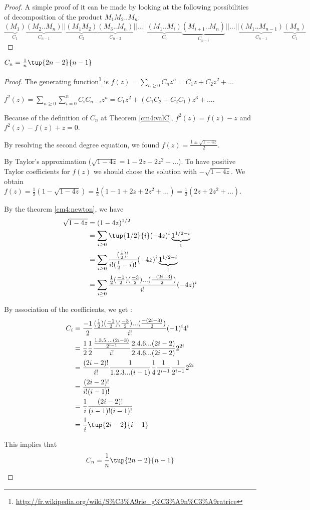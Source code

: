 \begin{proof} A simple proof of it can be made by looking at the following possibilities of decomposition of the product $M_1M_2..M_n$: 
$$\underbrace{(M_1)}_{C_1}\underbrace{(M_2..M_n)}_{C_{n-1}} || \underbrace{(M_1M_2)}_{C_2}\underbrace{(M_3..M_n)}_{C_{n-2}}|| ...|| \underbrace{(M_1..M_i)}_{C_i}\underbrace{(M_{i+1}..M_n)}_{C_{n-i}}|| ...|| \underbrace{(M_1..M_{n-1})}_{C_{n-1}}\underbrace{(M_n)}_{C_1}$$
\end{proof}



\begin{theorem}
$C_n = \frac{1}{n} \tup{2n-2}{n-1}$
\end{theorem}

\begin{proof}
The generating function\footnote{\url{http://fr.wikipedia.org/wiki/S\%C3\%A9rie_g\%C3\%A9n\%C3\%A9ratrice}} is $f(z) = \sum_{n\geq 0} C_n z^n = C_1z+C_2z^2 +...$

$f^2(z) = \sum_{n \geq 0}\sum_{i=0}^{n}C_i C_{n-i} z^n = C_1z^2+(C_1C_2+C_2C_1)z^3+....$ 

Because of the definition of $C_n$ at Theorem \ref{cm4:valC}, $f^2(z)=f(z) - z$ and $f^2(z)-f(z)+z = 0$.

By resolving the second degree equation, we found $f(z)=\frac{1\pm \sqrt{1-4z}}{2}$.

By Taylor's approximation ($\sqrt{1-4z}  = 1-2z-2z^2-...$). To have positive Taylor coefficients for $f(z)$ we should chose the solution with $-\sqrt{1-4z}$. We obtain $f(z) = \frac{1}{2}(1-\sqrt{1-4z}) = \frac{1}{2}(1-1+2z+2z^2+...) = \frac{1}{2}(2z+2z^2+...)$.

By the theorem \ref{cm4:newton}, we have
\begin{align*}
\sqrt{1-4z} &= (1-4z)^{1/2}\\
&= \sum_{i\geq 0} \tup{1/2}{i}(-4z)^i \underbrace{1^{1/2-i}}_{1}\\
&= \sum_{i\geq 0}\frac{(\frac{1}{2})!}{i!(\frac{1}{2} - i)!}(-4z)^i \underbrace{1^{1/2-i}}_{1}\\
&= \sum_{i\geq 0} \frac{\frac{1}{2}(\frac{-1}{2})(\frac{-3}{2}) ... (\frac{-(2i-3)}{2})}{i!} (-4z)^i
\end{align*}

By association of the coefficients, we get :
\begin{align*}
C_i &= \frac{-1}{2} \frac{(\frac{1}{2})(\frac{-1}{2})(\frac{-3}{2}) ... (\frac{-(2i-3)}{2})}{i!} (-1)^i 4^i\\
&=  \frac{1}{2}\frac{1}{2} \frac{\frac{1.3.5....(2i-3)}{2^{i-1}}}{i!}\frac{2.4.6...(2i-2)}{2.4.6...(2i-2)} 2^{2i} \\
&=\frac{(2i-2)!}{i!}\frac{1}{1.2.3...(i-1)}\frac{1}{4}\frac{1}{2^{i-1}}\frac{1}{2^{i-1}}2^{2i}\\
&=\frac{(2i-2)!}{i!(i-1)!} \\
&= \frac{1}{i}\frac{(2i-2)!}{(i-1)!(i-1)!}\\
&= \frac{1}{i}\tup{2i-2}{i-1}
\end{align*}

This implies that $$C_n = \frac{1}{n}\tup{2n-2}{n-1}$$
\end{proof}


